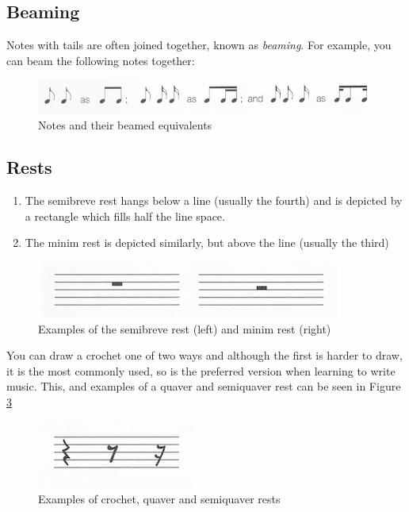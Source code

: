 \subsection{Beaming}

Notes with tails are often joined together, known as \emph{beaming}. For example, you can beam the following notes together:

\begin{figure}[h!]
  \includegraphics[width=\linewidth]{gfx/basic/beaming.png}
  \centering
  \caption{Notes and their beamed equivalents}
  \label{fig:NotesBeamedEquiv}
\end{figure}


\subsection{Rests}

\begin{enumerate}
\item The semibreve rest hangs below a line (usually the fourth) and is depicted by a rectangle which fills half the line space.
\item The minim rest is depicted similarly, but above the line (usually the third)
\end{enumerate}

\begin{figure}[h!]
  \includegraphics[width=0.7\linewidth]{gfx/basic/semibreve-minim-rest.png}
  \centering
  \caption{Examples of the semibreve rest (left) and minim rest (right)}
  \label{fig:RestMinimSemibreve}
\end{figure}

You can draw a crochet one of two ways and although the first is harder to draw, it is the most commonly used, so is the preferred version when learning to write music. This, and examples of a quaver and semiquaver rest can be seen in Figure \cref{fig:RestCrochetQS}

\begin{figure}[h!]
  \includegraphics[width=0.5\linewidth]{gfx/basic/rests.png}
  \centering
  \caption{Examples of crochet, quaver and semiquaver rests}
  \label{fig:RestCrochetQS}
\end{figure}


